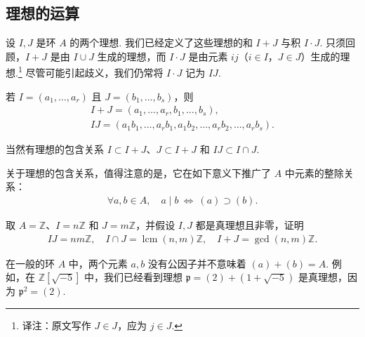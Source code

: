 \subsection{理想的运算}\label{sec:galois-1-2-9}
设 $I,J$ 是环 $A$ 的两个理想. 我们已经定义了这些理想的和 $I+J$ 与积 $I\cdot J$. 只须回顾，$I+J$ 是由 $I\cup J$ 生成的理想，而 $I\cdot J$ 是由元素 $ij$（$i\in I$，$J\in J$）生成的理想.\footnote{译注：原文写作 $J\in J$，应为 $j\in J$.} 尽管可能引起歧义，我们仍常将 $I\cdot J$ 记为 $IJ$.
\begin{remark*}
若 $I=(a_1,\ldots,a_r)$ 且 $J=(b_1,\ldots,b_s)$，则
\begin{align*}
I+J=(a_1,\ldots,a_r,b_1,\ldots,b_s),
\\
IJ=(a_1b_1,\ldots,a_rb_1,a_1b_2,\ldots,a_rb_2,\ldots,a_rb_s).
\end{align*}
\end{remark*}
当然有理想的包含关系 $I\subset I+J$、$J\subset I+J$ 和 $IJ\subset I\cap J$.
\begin{remark*}
关于理想的包含关系，值得注意的是，它在如下意义下推广了 $A$ 中元素的整除关系：
\begin{align*}
\forall a,b\in A,\quad a\mid b\ \Longleftrightarrow\ (a)\supset(b).
\end{align*}
\end{remark*}
\begin{exercise*}
取 $A=\mathbb Z$、$I=n\mathbb Z$ 和 $J=m\mathbb Z$，并假设 $I,J$ 都是真理想且非零，证明
\begin{align*}
IJ=nm\mathbb Z,\quad I\cap J=\operatorname{lcm}(n,m)\mathbb Z,\quad I+J=\gcd(n,m)\mathbb Z.
\end{align*}
\end{exercise*}
\begin{remark*}
在一般的环 $A$ 中，两个元素 $a,b$ 没有公因子并不意味着 $(a)+(b)=A$. 例如，在 $\mathbb Z[\sqrt{-5}]$ 中，我们已经看到理想 $\mathfrak p=(2)+(1+\sqrt{-5})$ 是真理想，因为 $\mathfrak p^2=(2)$.
\end{remark*}

